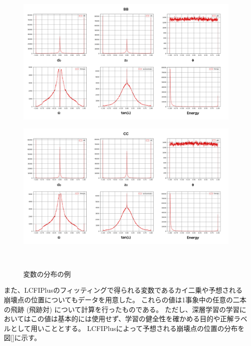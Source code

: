 \begin{figure}[htbp]
  \begin{minipage}{1.0\textwidth}
  \centering
   \begin{minipage}{0.48\textwidth}
   \centering
    \includegraphics[width=1.0\textwidth, clip]{Figure/3Networks/3-1-2-2ReshapedVariablesBB.png}
    \label{3-1-2-2ReshapedVariablesBB}
   \end{minipage}
   \begin{minipage}{0.48\textwidth}
   \centering
    \includegraphics[width=1.0\textwidth, clip]{Figure/3Networks/3-1-2-2ReshapedVariablesCC.png}
    \label{3-1-2-2ReshapedVariablesCC}
   \end{minipage}
   \end{minipage}
  \caption{変数の分布の例}
  \label{3-1-2-2Variables}
\end{figure}

また、LCFIPlusのフィッティングで得られる変数であるカイ二乗や予想される崩壊点の位置についてもデータを用意した。
これらの値は1事象中の任意の二本の飛跡 (飛跡対) について計算を行ったものである。
ただし、深層学習の学習においてはこの値は基本的には使用せず、学習の健全性を確かめる目的や正解ラベルとして用いこととする。
LCFIPlusによって予想される崩壊点の位置の分布を図\ref{}に示す。

